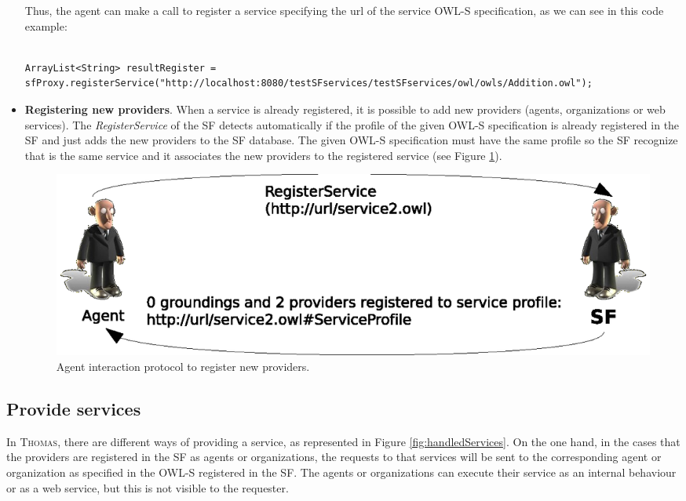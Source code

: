 \begin{itemize}
Thus, the agent can make a call to register a service specifying the url of the service OWL-S specification, as we can see in this code example:

\begin{lstlisting}

ArrayList<String> resultRegister = sfProxy.registerService("http://localhost:8080/testSFservices/testSFservices/owl/owls/Addition.owl");
\end{lstlisting}

\item \textbf{Registering new providers}. When a service is already registered, it is possible to add new providers (agents, organizations or web services). The \textit{RegisterService} of the SF detects automatically if the profile of the given OWL-S specification is already registered in the SF and just adds the new providers to the SF database. The given OWL-S specification must have the same profile so the SF recognize that is the same service and it associates the new providers to the registered service (see Figure \ref{fig:registerServiceProv}).

\begin{figure}[h!t]
	\centering
	\includegraphics[width=.8\textwidth]{Thomas/images/registerServiceProv}
	\caption{Agent interaction protocol to register new providers.}
	\label{fig:registerServiceProv}
\end{figure}


\end{itemize}

\subsection{Provide services}
In \textsc{Thomas}, there are different ways of providing a service, as represented in Figure \ref{fig:handledServices}. On the one hand, in the cases that the providers are registered in the SF as agents or organizations, the requests to that services will be sent to the corresponding agent or organization as specified in the OWL-S registered in the SF. The agents or organizations can execute their service as an internal behaviour or as a web service, but this is not visible to the requester. 
 
